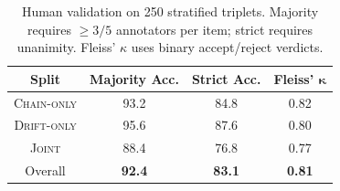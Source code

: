 \begin{table}[!t]
\centering
\small
\setlength{\tabcolsep}{3pt}
\renewcommand{\arraystretch}{1.35}

\begin{tabular*}{\columnwidth}{
    @{\extracolsep{\fill}}cccc@{}
}
\toprule
\textbf{Split}
& \textbf{Majority Acc.}
& \textbf{Strict Acc.}
& \textbf{Fleiss' $\boldsymbol{\kappa}$} \\
\midrule
\textsc{Chain-only} & 93.2 & 84.8 & 0.82 \\
\textsc{Drift-only} & 95.6 & 87.6 & 0.80 \\
\textsc{Joint}      & 88.4 & 76.8 & 0.77 \\
\midrule
Overall             
& \textbf{92.4}
& \textbf{83.1}
& \textbf{0.81} \\
\bottomrule
\end{tabular*}

\vspace{-1mm}
\caption{Human validation on 250 stratified triplets. Majority requires $\geq 3/5$ annotators per item; strict requires unanimity. Fleiss' $\kappa$ uses binary accept/reject verdicts.}
\label{tab:human-validation}
\vspace{-5mm}
\end{table}